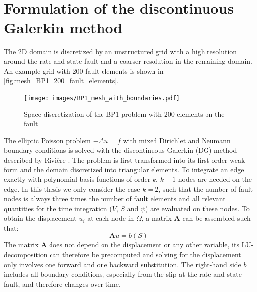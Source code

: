 \section{Formulation of the discontinuous Galerkin method}
\label{sec:2DSEAS__DG}
The 2D domain is discretized by an unstructured grid with a high resolution around the rate-and-state fault and a coarser resolution in the remaining domain. An example grid with 200 fault elements is shown in \autoref{fig:mesh_BP1_200_fault_elements}.

\begin{figure}[H]
	\centering
	\texttt{[image: images/BP1\_mesh\_with\_boundaries.pdf]}
	\caption{Space discretization of the BP1 problem with 200 elements on the fault}
	\label{fig:mesh_BP1_200_fault_elements}
\end{figure}

The elliptic Poisson problem $-\Delta u = f$ with mixed Dirichlet and Neumann boundary conditions is solved with the discontinuous Galerkin (DG) method described by Rivière \cite{DG-elliptic-problems}. The problem is first transformed into its first order weak form and the domain discretized into triangular elements. To integrate an edge exactly with polynomial basis functions of order $k$, $k+1$ nodes are needed on the edge. In this thesis we only consider the case $k=2$, such that the number of fault nodes is always three times the number of fault elements and all relevant quantities for the time integration ($V$, $S$ and $\psi$) are evaluated on these nodes. To obtain the displacement $u_i$ at each node in $\Omega$, a matrix $\mathbf{A}$ can be assembled \cite{DG_for_SEAS} such that:
\begin{equation}
	\mathbf{A}u = b(S)
\end{equation}
The matrix $\mathbf{A}$ does not depend on the displacement or any other variable, its LU-decomposition can therefore be precomputed and solving for the displacement only involves one forward and one backward substitution. The right-hand side $b$ includes all boundary conditions, especially from the slip at the rate-and-state fault, and therefore changes over time.


